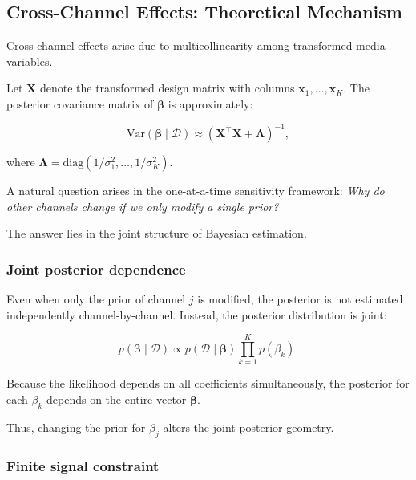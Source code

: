 \documentclass{article}
\begin{document}
\subsection{Cross-Channel Effects: Theoretical Mechanism}

Cross-channel effects arise due to multicollinearity among transformed media variables.

Let $\mathbf{X}$ denote the transformed design matrix with columns
$\mathbf{x}_1,\dots,\mathbf{x}_K$.
The posterior covariance matrix of $\boldsymbol{\beta}$ is approximately:

\begin{equation}
\mathrm{Var}(\boldsymbol{\beta} \mid \mathcal{D})
\approx
\left(
\mathbf{X}^\top \mathbf{X} + \mathbf{\Lambda}
\right)^{-1},
\end{equation}

where $\mathbf{\Lambda} = \mathrm{diag}(1/\sigma_1^2,\dots,1/\sigma_K^2)$. 

A natural question arises in the one-at-a-time sensitivity framework:
\emph{Why do other channels change if we only modify a single prior?}

The answer lies in the joint structure of Bayesian estimation.

\subsubsection*{Joint posterior dependence}

Even when only the prior of channel $j$ is modified,
the posterior is not estimated independently channel-by-channel.
Instead, the posterior distribution is joint:

\begin{equation}
p(\boldsymbol{\beta} \mid \mathcal{D})
\propto
p(\mathcal{D} \mid \boldsymbol{\beta})
\prod_{k=1}^K p(\beta_k).
\end{equation}

Because the likelihood depends on all coefficients simultaneously,
the posterior for each $\beta_k$ depends on the entire vector $\boldsymbol{\beta}$.

Thus, changing the prior for $\beta_j$
alters the joint posterior geometry.

\subsubsection*{Finite signal constraint}
\end{document}
